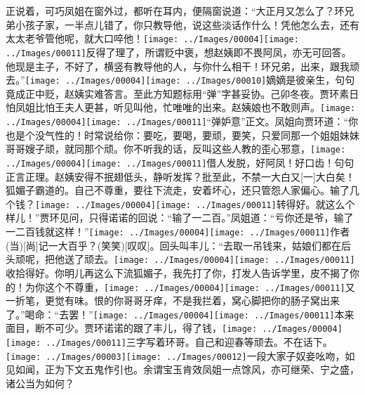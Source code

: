 正说着，可巧凤姐在窗外过，都听在耳内，便隔窗说道：``大正月又怎么了？环兄弟小孩子家，一半点儿错了，你只教导他，说这些淡话作什么！凭他怎么去，还有太太老爷管他呢，就大口啐他！{\texttt{[image: ../Images/00004]}\texttt{[image: ../Images/00011]}\footnotesize \kaishu 反得了理了，所谓贬中褒，想赵姨即不畏阿凤，亦无可回答。}他现是主子，不好了，横竖有教导他的人，与你什么相干！环兄弟，出来，跟我顽去。''{\texttt{[image: ../Images/00004]}\texttt{[image: ../Images/00010]}\footnotesize \kaishu 嫡嫡是彼亲生，句句竟成正中贬，赵姨实难答言。至此方知题标用``弹''字甚妥协。己卯冬夜。}贾环素日怕凤姐比怕王夫人更甚，听见叫他，忙唯唯的出来。赵姨娘也不敢则声。{\texttt{[image: ../Images/00004]}\texttt{[image: ../Images/00011]}\footnotesize \kaishu ``弹妒意''正文。}凤姐向贾环道：``你也是个没气性的！时常说给你：要吃，要喝，要顽，要笑，只爱同那一个姐姐妹妹哥哥嫂子顽，就同那个顽。你不听我的话，反叫这些人教的歪心邪意，{\texttt{[image: ../Images/00004]}\texttt{[image: ../Images/00011]}\footnotesize \kaishu 借人发脱，好阿凤！好口齿！句句正言正理。赵姨安得不抿翅低头，静听发挥？批至此，不禁一大白又{[}一{]}大白矣！}狐媚子霸道的。自己不尊重，要往下流走，安着坏心，还只管怨人家偏心。输了几个钱？{\texttt{[image: ../Images/00004]}\texttt{[image: ../Images/00011]}\footnotesize \kaishu 转得好。}就这么个样儿！''贾环见问，只得诺诺的回说：``输了一二百。''凤姐道：``亏你还是爷，输了一二百钱就这样！''{{\texttt{[image: ../Images/00004]}\texttt{[image: ../Images/00011]}\footnotesize \kaishu 作者{(当)}{[}尚{]}记一大百乎？{(笑笑)}{[}叹叹{]}。}}回头叫丰儿：``去取一吊钱来，姑娘们都在后头顽呢，把他送了顽去。{\texttt{[image: ../Images/00004]}\texttt{[image: ../Images/00011]}\footnotesize \kaishu 收拾得好。}你明儿再这么下流狐媚子，我先打了你，打发人告诉学里，皮不揭了你的！为你这个不尊重，{\texttt{[image: ../Images/00004]}\texttt{[image: ../Images/00011]}\footnotesize \kaishu 又一折笔，更觉有味。}恨的你哥哥牙痒，不是我拦着，窝心脚把你的肠子窝出来了。''喝命：``去罢！''{\texttt{[image: ../Images/00004]}\texttt{[image: ../Images/00011]}\footnotesize \kaishu 本来面目，断不可少。}贾环诺诺的跟了丰儿，得了钱，{\texttt{[image: ../Images/00004]}\texttt{[image: ../Images/00011]}\footnotesize \kaishu 三字写着环哥。}自己和迎春等顽去。不在话下。{\texttt{[image: ../Images/00003]}\texttt{[image: ../Images/00012]}\footnotesize \kaishu 一段大家子奴妾吆吻，如见如闻，正为下文五鬼作引也。余谓宝玉肯效凤姐一点馀风，亦可继荣、宁之盛，诸公当为如何？}

